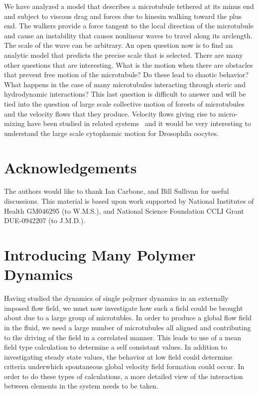 \documentclass[pre,showpacs]{revtex4}
\begin{document}
We have analyzed a model that describes a microtubule tethered at its minus
end and subject to viscous drag and forces due to kinesin walking toward the plus end. The walkers
provide a force tangent to the local direction of the microtubule and
cause an instability that causes nonlinear waves to travel along its
arclength. The scale of the wave can be arbitrary. An open question now 
is to find an analytic model that predicts the precise scale that
is selected. There are many other questions that are interesting.
What is the motion when there are obstacles that prevent free motion
of the microtubule? Do these lead to chaotic behavior? What happens
in the case of many microtubules interacting through steric and hydrodynamic
interactions? This last question is difficult to answer and will
be tied into the question of large scale collective motion of forests of
microtubules and the velocity flows that they produce. Velocity
flows giving rise to micro-mixing have been studied in related systems~\cite{GoldsteinTuvalvandeMeentPNAS,GoldsteinTuvalvandeMeentPRL,MeentSedermanGladdenGoldstein,VerchotLubiczGoldstein} and it would be very interesting to
understand the large scale cytoplasmic motion for Drosophila oocytes.


\section{Acknowledgements}

The authors would like to thank Ian Carbone, and Bill Sullivan for useful discussions.
This material is based upon work supported by National Institutes of Health GM046295 (to W.M.S.), and National Science Foundation
CCLI Grant DUE-0942207 (to J.M.D.).





\section{Introducing Many Polymer Dynamics}
Having studied the dynamics of single polymer dynamics in an externally imposed flow field, we must now investigate how such a field could be brought about due to a large group of microtubles. In order to produce a global flow field in the fluid, we need a large number of microtubules all aligned and contributing to the driving of the field in a correlated manner. This leads to use of a mean field type calculation to determine a self consistant values. In addition to investigating steady state values, the behavior at low field could determine criteria underwhich spontaneous global velocity field formation could occur. In order to do these types of calculations, a more detailed view of the interaction between elements in the system needs to be taken.
\end{document}
